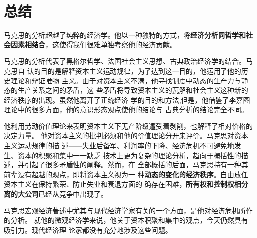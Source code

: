 \section{总结}

马克思的分析超越了纯粹的经济学。他以一种独特的方式，将\textbf{经济分析同哲学和社
  会因素相结合}，这使得我们很难单独考察他的经济贡献。

马克思的分析代表了黑格尔哲学、法国社会主义思想、古典政治经济学的结合。马克思自
认的目的是解释资本主义运动规律，为了达到这一目的，他运用了他的历史理论和辩证唯物
主义。由于对资本主义不满，他寻找制度中动态的生产力与静态的生产关系之间的矛盾，这
些矛盾将导致资本主义的瓦解和社会主义这种新的经济秩序的出现。虽然他离开了正统经济
学的目的和方法,但是，他借鉴了李嘉图理论中的很多方面，他的意识形态观点使他的结论与
古典分析的结论完全不同。

他利用劳动价值理论来表明资本主义下无产阶级遭受着剥削，也解释了相对价格的决定力量。
他对资本主义的批判必须和他的价值理论分开来评价。马克思对资本主义运动规律的描
述——失业后备军、利润率的下降、经济危机不可避免地发生、资本的积聚和集中一一缺乏
技术上更为复杂的理论分析，趋向于概括性的描述，并引起了很多矛盾性的阐释。然而，在
全部概括的后面，马克思持有一种其前辈没有超越的观点，即将资本主义视为一
种\textbf{动态的变化的经济秩序}。自由放任资本主义在保持繁荣、防止失业和衰退方面的
确存在困难，\textbf{所有权和控制权相分离的大公司}已经从竞争中出现了。

马克思宏观经济著述中尤其与现代经济学家有关的一个方面，是他对经济危机所作的分析。
就他的微观经济学来说，他关于资本积聚和集中的观点，今天仍然具有吸引力。现代经济理
论家都没有充分地涉及这些问题。

